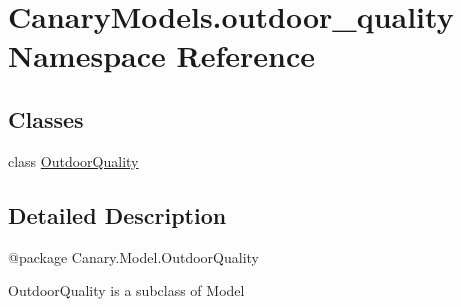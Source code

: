 \hypertarget{namespace_canary_models_1_1outdoor__quality}{\section{Canary\-Models.\-outdoor\-\_\-quality Namespace Reference}
\label{namespace_canary_models_1_1outdoor__quality}
}
\subsection*{Classes}
\begin{DoxyCompactItemize}
\item 
class \hyperlink{class_canary_models_1_1outdoor__quality_1_1_outdoor_quality}{Outdoor\-Quality}
\end{DoxyCompactItemize}


\subsection{Detailed Description}
\begin{DoxyVerb}@package Canary.Model.OutdoorQuality

OutdoorQuality is a subclass of Model
\end{DoxyVerb}
 